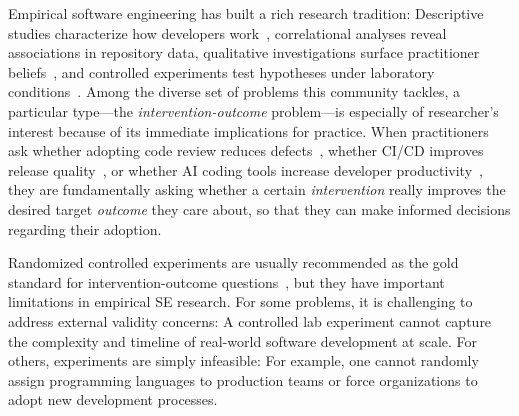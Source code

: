 Empirical software engineering has built a rich research tradition: Descriptive studies characterize how developers work~\cite{DBLP:journals/queue/ForsgrenSMZHB21}, correlational analyses reveal associations in repository data, qualitative investigations surface practitioner beliefs~\cite{DBLP:conf/icse/Devanbu0B16}, and controlled experiments test hypotheses under laboratory conditions~\cite{DBLP:books/sp/WohlinRHORW24}.
Among the diverse set of problems this community tackles, a particular type---the \emph{intervention-outcome} problem---is especially of researcher's interest because of its  immediate implications for practice.
When practitioners ask whether adopting code review reduces defects~\cite{DBLP:journals/ese/McIntoshKAH16}, whether CI/CD improves release quality~\cite{DBLP:conf/kbse/HiltonTHMD16}, or whether AI coding tools increase developer productivity~\cite{DBLP:conf/msr/HeMAKV26}, they are fundamentally asking whether a certain \emph{intervention} really improves the desired target \emph{outcome} they care about, so that they can make informed decisions regarding their adoption.

Randomized controlled experiments are usually recommended as the gold standard for intervention-outcome questions~\cite{shadish2002experimental}, but they have important limitations in empirical SE research.
For some problems, it is challenging to address external validity concerns: A controlled lab experiment cannot capture the complexity and timeline of real-world software development at scale.
For others, experiments are simply infeasible: For example, one cannot randomly assign programming languages to production teams or force organizations to adopt new development processes.

